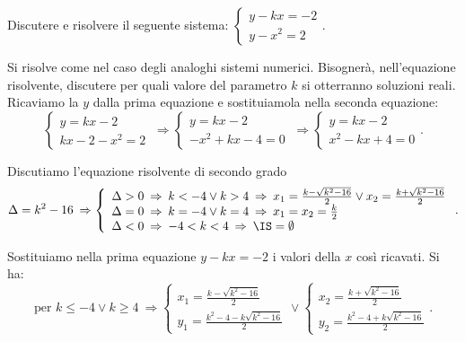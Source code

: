 \begin{exrig}
\begin{esempio}
Discutere e risolvere il seguente sistema: $\left\{\begin{array}{l}y-kx=-2\\y-x^2=2\end{array}\right.$.

Si risolve come nel caso degli analoghi sistemi numerici. Bisognerà, nell'equazione risolvente, discutere per quali valore del parametro $k$ si otterranno soluzioni reali. Ricaviamo la $y$ dalla prima equazione e sostituiamola nella seconda equazione:
\[ \left\{\begin{array}{l}y=kx-2\\kx-2-x^2=2\end{array}\right.\ \Rightarrow\left\{\begin{array}{l}y=kx-2\\-x^2+kx-4=0\end{array}\right.\ \Rightarrow\left\{\begin{array}{l}y=kx-2\\x^2-kx+4=0\end{array}\right.. \]

Discutiamo l'equazione risolvente di secondo grado 
\[ \Delta =k^2-16 \:\Rightarrow\left\{
\begin{array}{l}\Delta >0\:\Rightarrow\: k<-4\vee k>4\:\Rightarrow\: x_1=\frac{k-\sqrt{k^2-16}} 2\vee x_2=\frac{k+\sqrt{k^2-16}} 2\\
\Delta =0\:\Rightarrow\: k=-4\vee k=4\:\Rightarrow\: x_1=x_2=\frac k 2 \\
\Delta <0\:\Rightarrow\: -4<k<4\:\Rightarrow\: \IS=\emptyset \end{array}\right.. \]

Sostituiamo nella prima equazione $y-kx=-2$ i valori della $x$ così ricavati. Si ha: \[ \text{per } k\le -4\vee k\ge 4\:\Rightarrow \left\{\begin{array}{l}x_1=\frac{k-\sqrt{k^2-16}} 2 \\y_1=\frac{k^2-4-k\sqrt{k^2-16}} 2\end{array}\right.\vee \left\{\begin{array}{l}x_2=\frac{k+\sqrt{k^2-16}} 2 \\y_2=\frac{k^2-4+k\sqrt{k^2-16}} 2\end{array}\right..\]
\end{esempio}
\end{exrig}

